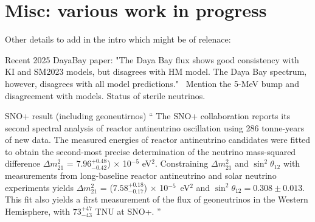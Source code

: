     
    


\section{Misc: various work in progress}

Other details to add in the intro which might be of relenace:

Recent 2025 DayaBay paper:
"The Daya Bay flux shows good consistency with KI and SM2023 models, but disagrees with HM model. The Daya Bay spectrum, however, disagrees with all model predictions."~\cite{An:2025ufv}
Mention the 5-MeV bump and disagreement with models.
Status of sterile neutrinos.


SNO+ result (including geoneutirnos)
``
The SNO+ collaboration reports its second spectral analysis of reactor antineutrino oscillation using 286 tonne-years of new data.  The measured energies of reactor antineutrino candidates were fitted to obtain the second-most precise determination of the neutrino mass-squared difference $\Delta m^2_{21}$ = $7.96^{+0.48}_{-0.42}$) $\times$ 10$^{-5}$ eV$^2$. 
Constraining $\Delta m^2_{21}$ and $\sin^2\theta_{12}$ with measurements from long-baseline reactor antineutrino and solar neutrino experiments yields $\Delta m^2_{21}$ = ($7.58^{+0.18}_{-0.17}$) $\times$ 10$^{-5}$~eV$^2$ and $\sin^2\theta_{12} = 0.308 \pm 0.013$. %
This fit also yields a first measurement of the flux of geoneutrinos in the Western Hemisphere, with $73^{+47}_{-43}$ TNU at SNO+. ''

